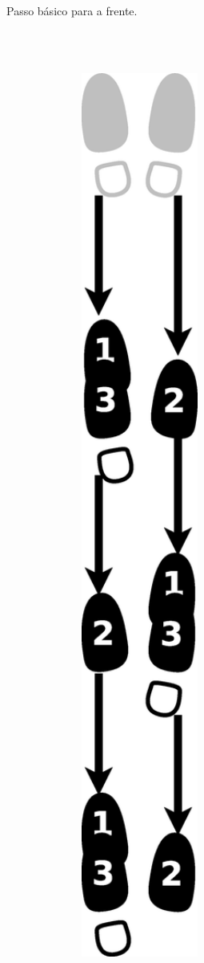 \begin{itemize}
\begin{figure}[h]
\begin{subfigure}[b]{0.65\textwidth}
        \caption{Passo básico para a frente.}
        \label{fig:samba-batucada-basico-frente}
    \end{subfigure}
    ~\\~\\ %
    \begin{subfigure}[b]{0.65\textwidth}
        \centering
	\includegraphics[angle=270,width=0.97\textwidth]{chapters/cap-historia-sambagafieira/samba-batucada-basico-tras.eps}

\end{subfigure}
\end{figure}
\end{itemize}
